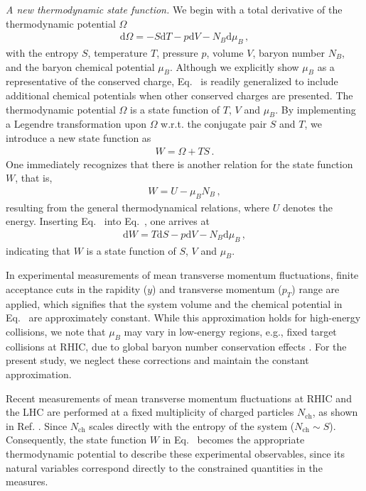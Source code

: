 \documentclass[aps,twocolumn,prd,superscriptaddress,nofootinbib,floatfix]{revtex4-2}
\begin{document}
\textit{A new thermodynamic state function.} \label{sec:Wfunction}  We begin with a total derivative of the thermodynamic potential $\Omega$
\begin{align}
    \mathrm{d} \Omega=-S \mathrm{d} T-p \mathrm{d}V-N_B \mathrm{d} \mu_B\,, \label{eq:dOmega}
\end{align}
with the entropy $S$, temperature $T$, pressure $p$, volume $V$, baryon number $N_B$, and the baryon chemical potential $\mu_B$. Although we explicitly show $\mu_B$ as a representative of the conserved charge, Eq.~ is readily generalized to include additional chemical potentials when other conserved charges are presented. The thermodynamic potential $\Omega$ is a state function of $T$, $V$ and $\mu_B$. By implementing a Legendre transformation upon $\Omega$ w.r.t. the conjugate pair $S$ and $T$, we introduce a new state function as
\begin{align}
    W=\Omega+TS\,. \label{eq:W-def}
\end{align}
One immediately recognizes that there is another relation for the state function $W$, that is,
\begin{align}
    W=U-\mu_B N_B\,,\label{}
\end{align}
resulting from the general thermodynamical relations, where $U$ denotes the energy. Inserting Eq.~ into Eq.~, one arrives at
\begin{align}
    \mathrm{d} W=T\mathrm{d} S-p \mathrm{d}V-N_B \mathrm{d} \mu_B\,, \label{eq:dW}
\end{align}
indicating that $W$ is a state function of $S$, $V$ and $\mu_B$.

In experimental measurements of mean transverse momentum fluctuations, finite acceptance cuts in the rapidity ($y$) and transverse momentum ($p_{T}$) range are applied, which signifies that the system volume and the chemical potential in Eq.~ are approximately constant. While this approximation holds for high-energy collisions, we note that $\mu_B$ may vary in low-energy regions, e.g., fixed target collisions at RHIC, due to global baryon number conservation effects \cite{Braun-Munzinger:2020jbk, Vovchenko:2021kxx, Fu:2023lcm}. For the present study, we neglect these corrections and maintain the constant approximation. 

Recent measurements of mean transverse momentum fluctuations at RHIC and the LHC are performed at a fixed multiplicity of charged particles $N_{\mathrm{ch}}$, as shown in Ref. \cite{ALICE:2023tej, ATLAS:2024jvf, QM2025rutik, QM2025gao}. Since $N_{\mathrm{ch}}$ scales directly with the entropy of the system ($N_{\mathrm{ch}}\sim S$). Consequently, the state function $W$ in Eq.~ becomes the appropriate thermodynamic potential to describe these experimental observables, since its natural variables correspond directly to the constrained quantities in the measures.
\end{document}
